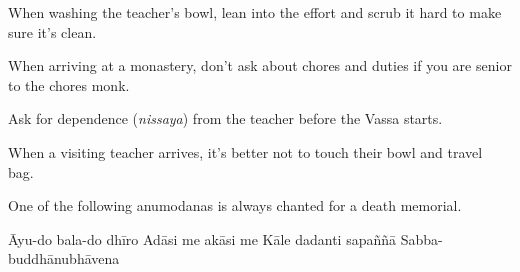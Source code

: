 \begin{exam}{\autoExamName}
\begin{problem*}
\begin{parts}
  \item {} When washing the teacher's bowl, lean into the effort and scrub
    it hard to make sure it's clean.

  \item {} When arriving at a monastery, don't ask about chores and duties
    if you are senior to the chores monk.

  \item {} Ask for dependence (\textit{nissaya}) from the teacher before the
    Vassa starts.

  \item {} When a visiting teacher arrives, it's better not to touch their
    bowl and travel bag.

\end{parts}

\end{problem*}

\clearpage

\begin{problem}

\item One of the following anumodanas is always chanted for a death memorial.

  \bigskip

  \begin{answers}{1}
    \bChoices
     Āyu-do bala-do dhīro\eAns
     Adāsi me akāsi me\eAns
     Kāle dadanti sapaññā\eAns
     Sabba-buddhānubhāvena\eAns
    \eChoices
  \end{answers}

\end{problem}

\end{exam}
